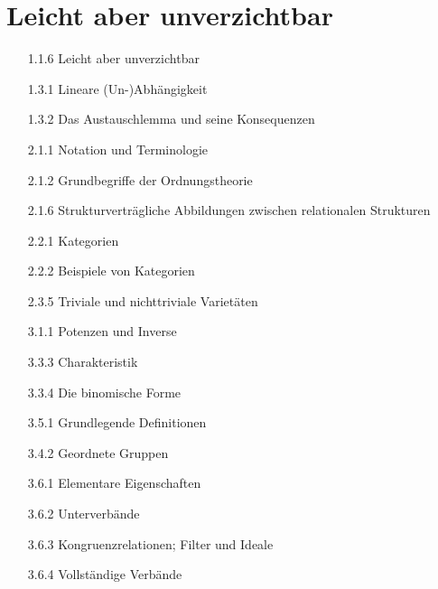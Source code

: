 \section{Leicht aber unverzichtbar}

\begin{itemize}

  \item
  [1.1.6]
  Leicht aber unverzichtbar

  \item
  [1.3.1]
  Lineare (Un-)Abhängigkeit

  \item
  [1.3.2]
  Das Austauschlemma und seine Konsequenzen

  \item
  [2.1.1]
  Notation und Terminologie

  \item
  [2.1.2]
  Grundbegriffe der Ordnungstheorie

  \item
  [2.1.6]
  Strukturverträgliche Abbildungen zwischen relationalen Strukturen

  \item
  [2.2.1]
  Kategorien

  \item
  [2.2.2]
  Beispiele von Kategorien

  \item
  [2.3.5]
  Triviale und nichttriviale Varietäten

  \item
  [3.1.1]
  Potenzen und Inverse

  \item
  [3.3.3]
  Charakteristik

  \item
  [3.3.4]
  Die binomische Forme

  \item
  [3.5.1]
  Grundlegende Definitionen

  \item
  [3.4.2]
  Geordnete Gruppen

  \item
  [3.6.1]
  Elementare Eigenschaften

  \item
  [3.6.2]
  Unterverbände

  \item
  [3.6.3]
  Kongruenzrelationen; Filter und Ideale

  \item
  [3.6.4]
  Vollständige Verbände


\end{itemize}

